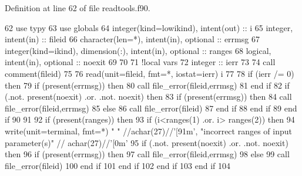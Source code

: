 Definition at line 62 of file readtools.\+f90.


\begin{DoxyCode}
62       \textcolor{keywordtype}{use }typy
63       \textcolor{keywordtype}{use }globals
64       \textcolor{keywordtype}{integer(kind=lowikind)}, \textcolor{keywordtype}{intent(out)} :: i
65       \textcolor{keywordtype}{integer}, \textcolor{keywordtype}{intent(in)} :: fileid
66       \textcolor{keywordtype}{character(len=*)}, \textcolor{keywordtype}{intent(in)}, \textcolor{keywordtype}{optional} :: errmsg
67       \textcolor{keywordtype}{integer(kind=ikind)}, \textcolor{keywordtype}{dimension(:)}, \textcolor{keywordtype}{intent(in)},  \textcolor{keywordtype}{optional} :: ranges
68       \textcolor{keywordtype}{logical}, \textcolor{keywordtype}{intent(in)}, \textcolor{keywordtype}{optional} :: noexit
69 
70 
71       \textcolor{comment}{!local vars}
72       \textcolor{keywordtype}{integer} :: ierr
73 
74       \textcolor{keyword}{call }comment(fileid)
75 
76       \textcolor{keyword}{read}(unit=fileid, fmt=*, iostat=ierr) i
77 
78       \textcolor{keywordflow}{if} (ierr /= 0) \textcolor{keywordflow}{then}
79         \textcolor{keywordflow}{if} (\textcolor{keyword}{present}(errmsg)) \textcolor{keywordflow}{then}
80           \textcolor{keyword}{call }file_error(fileid,errmsg)
81 \textcolor{keywordflow}{        end if}
82         \textcolor{keywordflow}{if} (.not. \textcolor{keyword}{present}(noexit) .or. .not. noexit) \textcolor{keywordflow}{then}
83           \textcolor{keywordflow}{if} (\textcolor{keyword}{present}(errmsg)) \textcolor{keywordflow}{then}
84             \textcolor{keyword}{call }file_error(fileid,errmsg)
85           \textcolor{keywordflow}{else}
86             \textcolor{keyword}{call }file_error(fileid)
87 \textcolor{keywordflow}{          end if}
88 \textcolor{keywordflow}{        end if}
89 \textcolor{keywordflow}{      end if}
90       
91       
92        \textcolor{keywordflow}{if} (\textcolor{keyword}{present}(ranges)) \textcolor{keywordflow}{then}
93         \textcolor{keywordflow}{if} (i<ranges(1) .or. i> ranges(2)) \textcolor{keywordflow}{then}
94           \textcolor{keyword}{write}(unit=terminal, fmt=*) \textcolor{stringliteral}{" "} //achar(27)//\textcolor{stringliteral}{'[91m'}, \textcolor{stringliteral}{"incorrect ranges of input parameter(s)"}\textcolor{comment}{ //
      achar(27)//}\textcolor{stringliteral}{'[0m'}
95           \textcolor{keywordflow}{if} (.not. \textcolor{keyword}{present}(noexit) .or. .not. noexit) \textcolor{keywordflow}{then}
96             \textcolor{keywordflow}{if} (\textcolor{keyword}{present}(errmsg)) \textcolor{keywordflow}{then}
97               \textcolor{keyword}{call }file_error(fileid,errmsg)
98             \textcolor{keywordflow}{else}
99               \textcolor{keyword}{call }file_error(fileid)
100 \textcolor{keywordflow}{            end if}
101 \textcolor{keywordflow}{          end if}
102 \textcolor{keywordflow}{        end if}
103 \textcolor{keywordflow}{      end if}
104 
\end{DoxyCode}
